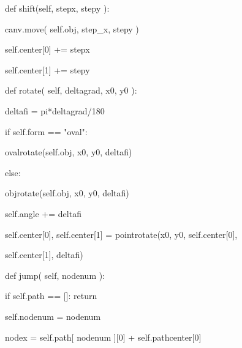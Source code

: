 \documentclass[14pt, oneside]{SavkinSeliverstov}
\begin{document}
	
	def shift(self, step\underline{\hspace{0.2cm}}x, step\underline{\hspace{0.2cm}}y ):
	
		canv.move( self.obj, step_x, step\underline{\hspace{0.2cm}}y  )
		
		self.center[0] += step\underline{\hspace{0.2cm}}x
		
		self.center[1] += step\underline{\hspace{0.2cm}}y
		
	
	def rotate( self, delta\underline{\hspace{0.2cm}}grad, x0, y0 ):
	
		delta\underline{\hspace{0.2cm}}fi = pi*delta\underline{\hspace{0.2cm}}grad/180

		if self.form == "oval":
		
			oval\underline{\hspace{0.2cm}}rotate(self.obj, x0, y0, delta\underline{\hspace{0.2cm}}fi)
			
		else:
		
			obj\underline{\hspace{0.2cm}}rotate(self.obj, x0, y0, delta\underline{\hspace{0.2cm}}fi)

		self.angle += delta\underline{\hspace{0.2cm}}fi
		
		self.center[0], self.center[1] = point\underline{\hspace{0.2cm}}rotate(x0, y0, self.center[0],
		
		self.center[1], delta\underline{\hspace{0.2cm}}fi)

	
	def jump( self, node\underline{\hspace{0.2cm}}num ):
	
		if self.path == []:  return
		
		self.node\underline{\hspace{0.2cm}}num = node\underline{\hspace{0.2cm}}num
		
		
		
		node\underline{\hspace{0.2cm}}x = self.path[ node\underline{\hspace{0.2cm}}num ][0] + self.path\underline{\hspace{0.2cm}}center[0]
		
\end{document}
